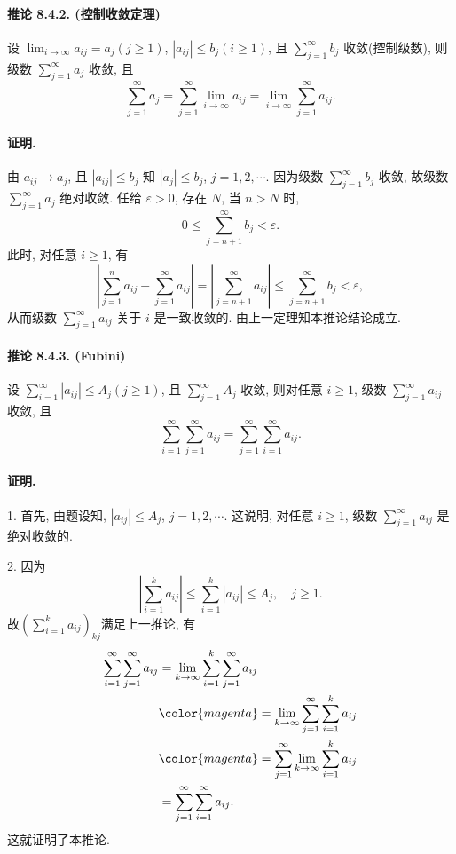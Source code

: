 \paragraph{推论 8.4.2. (控制收敛定理)}

设 $\lim_{i\rightarrow\infty}a_{ij}=a_{j}(j\geqslant1)$, $\left|a_{ij}\right|\leqslant b_{j}(i\geqslant1)$,
且 $\sum_{j=1}^{\infty}b_{j}$ 收敛(控制级数), 则级数 $\sum_{j=1}^{\infty}a_{j}$
收敛, 且 
\[
\sum_{j=1}^{\infty}a_{j}=\sum_{j=1}^{\infty}\lim_{i\rightarrow\infty}a_{ij}=\lim_{i\rightarrow\infty}\sum_{j=1}^{\infty}a_{ij}.
\]


\paragraph{证明. }

由 $a_{ij}\rightarrow a_{j}$, 且 $\left|a_{ij}\right|\leqslant b_{j}$
知 $\left|a_{j}\right|\leqslant b_{j}$, $j=1,2,\cdots$. 因为级数 $\sum_{j=1}^{\infty}b_{j}$
收敛, 故级数 $\sum_{j=1}^{\infty}a_{j}$ 绝对收敛. 任给 $\varepsilon>0$, 存在
$N$, 当 $n>N$ 时, 
\[
0\leqslant\sum_{j=n+1}^{\infty}b_{j}<\varepsilon.
\]
此时, 对任意 $i\geqslant1$, 有 
\[
\left|\sum_{j=1}^{n}a_{ij}-\sum_{j=1}^{\infty}a_{ij}\right|=\left|\sum_{j=n+1}^{\infty}a_{ij}\right|\leqslant\sum_{j=n+1}^{\infty}b_{j}<\varepsilon,
\]
从而级数 $\sum_{j=1}^{\infty}a_{ij}$ 关于 $i$ 是一致收敛的. 由上一定理知本推论结论成立.

\paragraph{推论 8.4.3. (Fubini)}

设 $\sum_{i=1}^{\infty}\left|a_{ij}\right|\leqslant A_{j}(j\geqslant1)$,
且 $\sum_{j=1}^{\infty}A_{j}$ 收敛, 则对任意 $i\geqslant1$, 级数 $\sum_{j=1}^{\infty}a_{ij}$
收敛, 且 
\[
\sum_{i=1}^{\infty}\sum_{j=1}^{\infty}a_{ij}=\sum_{j=1}^{\infty}\sum_{i=1}^{\infty}a_{ij}.
\]


\paragraph{证明. }

1. 首先, 由题设知, $\left|a_{ij}\right|\leqslant A_{j}$, $j=1,2,\cdots$.
这说明, 对任意 $i\geqslant1$, 级数 $\sum_{j=1}^{\infty}a_{ij}$ 是绝对收敛的. 

2. 因为 
\[
\left|\sum_{i=1}^{k}a_{ij}\right|\leqslant\sum_{i=1}^{k}\left|a_{ij}\right|\leqslant A_{j},\quad j\geqslant1.
\]
故$\left(\sum_{i=1}^{k}a_{ij}\right)_{kj}$满足上一推论, 有 
\[
\begin{aligned}\sum_{i=1}^{\infty}\sum_{j=1}^{\infty}a_{ij} & =\lim_{k\rightarrow\infty}\sum_{i=1}^{k}\sum_{j=1}^{\infty}a_{ij}\\
 & {\color{magenta}=\lim_{k\rightarrow\infty}\sum_{j=1}^{\infty}\sum_{i=1}^{k}a_{ij}}\\
 & {\color{magenta}=\sum_{j=1}^{\infty}\lim_{k\rightarrow\infty}\sum_{i=1}^{k}a_{ij}}\\
 & =\sum_{j=1}^{\infty}\sum_{i=1}^{\infty}a_{ij}.
\end{aligned}
\]
这就证明了本推论.

